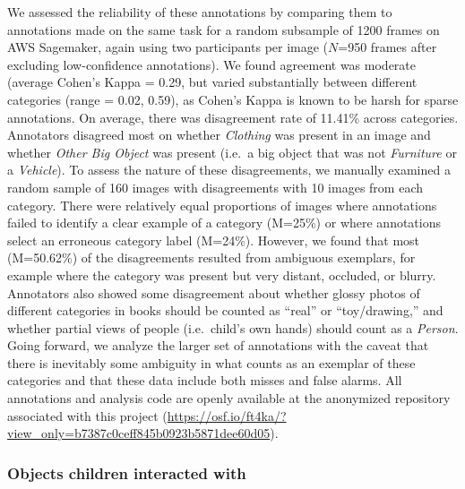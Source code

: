 \documentclass[10pt, letterpaper]{article}
\begin{document}
We assessed the reliability of these annotations by comparing them to
annotations made on the same task for a random subsample of 1200 frames
on AWS Sagemaker, again using two participants per image (\(N\)=950
frames after excluding low-confidence annotations). We found agreement
was moderate (average Cohen's Kappa = 0.29, but varied substantially
between different categories (range = 0.02, 0.59), as Cohen's Kappa is
known to be harsh for sparse annotations. On average, there was
disagreement rate of 11.41\% across categories. Annotators disagreed
most on whether \emph{Clothing} was present in an image and whether
\emph{Other Big Object} was present (i.e.~a big object that was not
\emph{Furniture} or a \emph{Vehicle}). To assess the nature of these
disagreements, we manually examined a random sample of 160 images with
disagreements with 10 images from each category. There were relatively
equal proportions of images where annotations failed to identify a clear
example of a category (M=25\%) or where annotations select an erroneous
category label (M=24\%). However, we found that most (M=50.62\%) of the
disagreements resulted from ambiguous exemplars, for example where the
category was present but very distant, occluded, or blurry. Annotators
also showed some disagreement about whether glossy photos of different
categories in books should be counted as ``real'' or ``toy/drawing,''
and whether partial views of people (i.e.~child's own hands) should
count as a \emph{Person}. Going forward, we analyze the larger set of
annotations with the caveat that there is inevitably some ambiguity in
what counts as an exemplar of these categories and that these data
include both misses and false alarms. All annotations and analysis code
are openly available at the anonymized repository associated with this
project
(\url{https://osf.io/ft4ka/?view_only=b7387c0ceff845b0923b5871dee60d05}).

\hypertarget{objects-children-interacted-with}{%
\subsubsection{Objects children interacted
with}\label{objects-children-interacted-with}}
\end{document}
